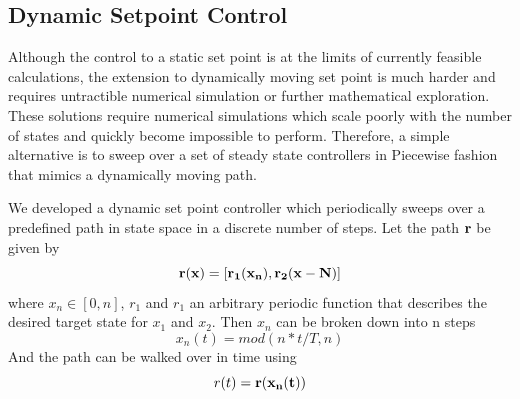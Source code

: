 \documentclass[12pt]{article}
\begin{document}

\subsection{Dynamic Setpoint Control}

Although the control to a static set point is at the limits of currently feasible calculations, the extension to dynamically moving set point is much harder and requires untractible numerical simulation or further mathematical exploration. These solutions require numerical simulations which scale poorly with the number of states and quickly become impossible to perform. Therefore, a simple alternative is to sweep over a set of steady state controllers in Piecewise fashion that mimics a dynamically moving path.

We developed a dynamic set point controller which periodically sweeps over a predefined path in state space in a discrete number of steps. Let the path $\bf{r}$ be given by
\begin{equation}
\bf{r}(x)=[r_1(x_n),r_2(x-N)]
\end{equation}
where $x_n \in [0,n]$, $r_1$ and $r_1$ an arbitrary periodic function that describes the desired target state for $x_1$ and $x_2$. 
Then $x_n$ can be broken down into n steps
\begin{equation}
x_n(t)=mod(n*t/T,n)
\end{equation}
And the path can be walked over in time using
\begin{equation}
r(t)=\bf{r}(x_n(t))
\end{equation}
\end{document}
